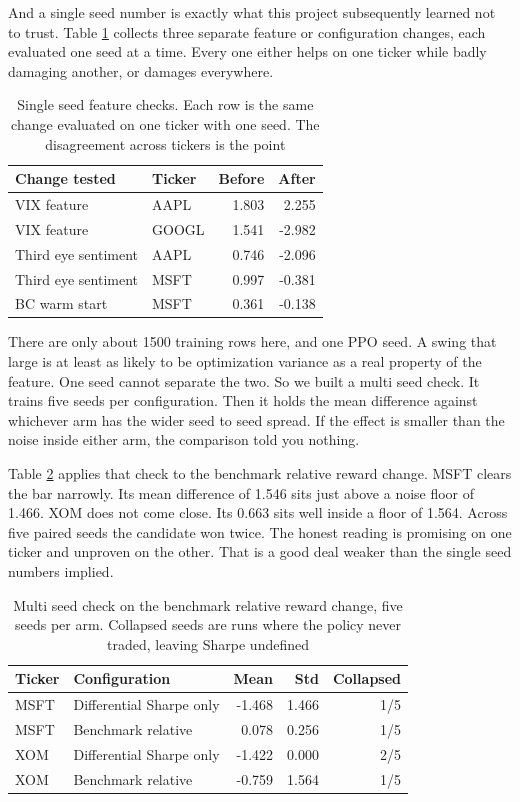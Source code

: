 \documentclass[conference]{IEEEtran}
\begin{document}
And a single seed number is exactly what this project subsequently learned not to trust. Table \ref{tab:singleseed} collects three separate feature or configuration changes, each evaluated one seed at a time. Every one either helps on one ticker while badly damaging another, or damages everywhere.

\begin{table}[t]
\caption{Single seed feature checks. Each row is the same change evaluated on one ticker with one seed. The disagreement across tickers is the point}
\label{tab:singleseed}
\centering
\begin{tabular}{llrr}
\toprule
Change tested & Ticker & Before & After \\
\midrule
VIX feature & AAPL & 1.803 & 2.255 \\
VIX feature & GOOGL & 1.541 & -2.982 \\
Third eye sentiment & AAPL & 0.746 & -2.096 \\
Third eye sentiment & MSFT & 0.997 & -0.381 \\
BC warm start & MSFT & 0.361 & -0.138 \\
\bottomrule
\end{tabular}
\end{table}

There are only about 1500 training rows here, and one PPO seed. A swing that large is at least as likely to be optimization variance as a real property of the feature. One seed cannot separate the two. So we built a multi seed check. It trains five seeds per configuration. Then it holds the mean difference against whichever arm has the wider seed to seed spread. If the effect is smaller than the noise inside either arm, the comparison told you nothing.

Table \ref{tab:multiseed} applies that check to the benchmark relative reward change. MSFT clears the bar narrowly. Its mean difference of 1.546 sits just above a noise floor of 1.466. XOM does not come close. Its 0.663 sits well inside a floor of 1.564. Across five paired seeds the candidate won twice. The honest reading is promising on one ticker and unproven on the other. That is a good deal weaker than the single seed numbers implied.

\begin{table}[t]
\caption{Multi seed check on the benchmark relative reward change, five seeds per arm. Collapsed seeds are runs where the policy never traded, leaving Sharpe undefined}
\label{tab:multiseed}
\centering
\begin{tabular}{llrrr}
\toprule
Ticker & Configuration & Mean & Std & Collapsed \\
\midrule
MSFT & Differential Sharpe only & -1.468 & 1.466 & 1/5 \\
MSFT & Benchmark relative & 0.078 & 0.256 & 1/5 \\
XOM & Differential Sharpe only & -1.422 & 0.000 & 2/5 \\
XOM & Benchmark relative & -0.759 & 1.564 & 1/5 \\
\bottomrule
\end{tabular}
\end{table}
\end{document}
